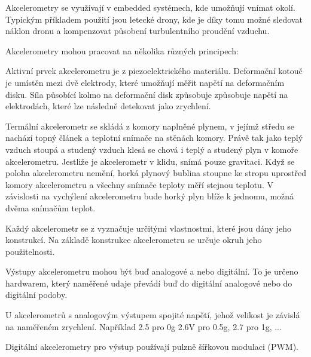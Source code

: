 Akcelerometry se využívají v embedded systémech, kde umožňují vnímat okolí. Typickým příkladem použití jsou letecké drony, kde je díky tomu možné sledovat náklon dronu a kompenzovat působení turbulentního proudění vzduchu.


Akcelerometry mohou pracovat na několika různých principech:
\vskip 4mm
\vskip 4mm


Aktivní prvek akcelerometru je z piezoelektrického materiálu. Deformační kotouč je umístěn mezi dvě elektrody, které umožňují měřit napětí na deformačním disku. Síla působící kolmo na deformační disk způsobuje způsobuje napětí na elektrodách, které lze následně detekovat jako zrychlení.


Termální akcelerometr se skládá z komory naplněné plynem, v jejímž středu se nachází topný článek a teplotní snímače na stěnách komory. Právě tak jako teplý vzduch stoupá a studený vzduch klesá se chová i teplý a studený plyn v komoře akcelerometru. Jestliže je akcelerometr v klidu, snímá pouze gravitaci. Když se poloha akcelerometru nemění, horká plynový bublina stoupne ke stropu uprostřed komory akcelerometru a všechny snímače teploty měří stejnou teplotu. V závislosti na vychýlení akcelerometru bude horký plyn blíže k jednomu, možná dvěma snímačům teplot.

\vskip 4mm
\centerline{}
\vskip 4mm

Každý akcelerometr se z vyznačuje určitými vlastnostmi, které jsou dány jeho konstrukcí. Na základě konstrukce akcelerometru se určuje okruh jeho použitelnosti.


Výstupy akcelerometru mohou být buď analogové a nebo digitální. To je určeno hardwarem, který naměřené udaje převádí buď do digitální analogové nebo do digitální podoby. 

U akcelerometrů s analogovým výstupem spojité napětí, jehož velikost je závislá na naměřeném zrychlení.  Například 2.5 pro 0g 2.6V pro 0.5g, 2.7 pro 1g, ...

Digitální akcelerometry pro výstup používají pulzně šířkovou modulaci (PWM).   


